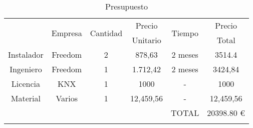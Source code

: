 \begin{flushleft}
\begin{longtable}[H]{|c|c|c|c|c|c|}
\hline 
\rule[0mm]{0mm}{5mm}
\multirow{2}{*}{Descripción} & \multirow{2}{*}{ Empresa} &  \multirow{2}{*}{Cantidad} & Precio  & \multirow{2}{*}{Tiempo} & Precio \\
&  &  &  Unitario &  & Total\\
\hline
\hline
\endhead
\rule[0mm]{0mm}{4mm}
Instalador & Freedom & 2 & 878,63 &  2 meses & 3514.4\\
\hline
\rule[0mm]{0mm}{4mm}
Ingeniero & Freedom & 1 & 1.712,42 & 2 meses & 3424,84\\
\hline
Licencia & KNX & 1 & 1000 & - & 1000\\
\hline
Material & Varios & 1 & 12,459,56 & - & 12,459,56\\
\hline
\hline
\rule[0mm]{0mm}{4mm}
 & & & &TOTAL&20398.80 €\\
\hline 
\caption{Presupuesto}
\label{tab:tabla_presupuesto}
\end{longtable}
\end{flushleft}